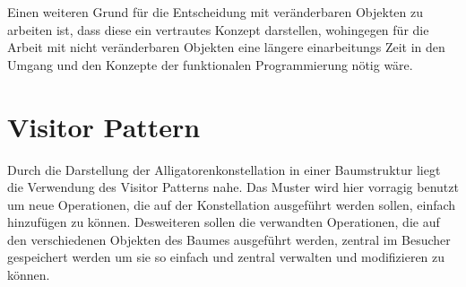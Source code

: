 Einen weiteren Grund für die Entscheidung mit veränderbaren Objekten zu arbeiten ist, dass diese ein vertrautes Konzept darstellen, wohingegen für die Arbeit mit nicht veränderbaren Objekten eine längere einarbeitungs Zeit in den Umgang und den Konzepte der funktionalen Programmierung nötig wäre.

\section{Visitor Pattern}
Durch die Darstellung der Alligatorenkonstellation in einer Baumstruktur liegt die Verwendung des Visitor Patterns nahe.
Das Muster wird hier vorragig benutzt um neue Operationen, die auf der Konstellation ausgeführt werden sollen, einfach hinzufügen zu können.
Desweiteren sollen die verwandten Operationen, die auf den verschiedenen Objekten des Baumes ausgeführt werden, zentral im Besucher gespeichert werden um sie so einfach und zentral verwalten und modifizieren zu können.
